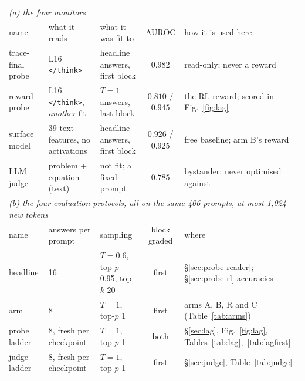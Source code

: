 \documentclass{article}
\begin{document}
\begin{table}[t]
\centering
\scriptsize
\setlength{\tabcolsep}{3pt}
\renewcommand{\arraystretch}{0.9}
\begin{tabular}{lllcl}
\toprule
\multicolumn{5}{l}{\emph{(a) the four monitors}} \\
name & what it reads & what it was fit to & AUROC & how it is used here \\
\midrule
trace-final probe & L16 \texttt{</think>} & headline answers, first block & $0.982$ & read-only; never a reward \\
reward probe & L16 \texttt{</think>}, \emph{another} fit & $T{=}1$ answers, last block & $0.810$ / $0.945$ & the RL reward; scored in Fig.~\ref{fig:lag} \\
surface model & 39 text features, no activations & headline answers, first block & $0.926$ / $0.925$ & free baseline; arm B's reward \\
LLM judge & problem + equation (text) & not fit; a fixed prompt & $0.785$ & bystander; never optimised against \\
\midrule
\multicolumn{5}{l}{\emph{(b) the four evaluation protocols, all on the same 406 prompts, at most 1{,}024 new tokens}} \\
name & answers per prompt & sampling & block graded & where \\
\midrule
headline & 16 & $T{=}0.6$, top-$p$ 0.95, top-$k$ 20 & first & \S\ref{sec:probe-reader}; \S\ref{sec:probe-rl} accuracies \\
arm & 8 & $T{=}1$, top-$p$ 1 & first & arms A, B, R and C (Table~\ref{tab:arms}) \\
probe ladder & 8, fresh per checkpoint & $T{=}1$, top-$p$ 1 & both & \S\ref{sec:lag}, Fig.~\ref{fig:lag}, Tables~\ref{tab:lag},~\ref{tab:lagfirst} \\
judge ladder & 8, fresh per checkpoint & $T{=}1$, top-$p$ 1 & first & \S\ref{sec:judge}, Table~\ref{tab:judge} \\
\bottomrule
\end{tabular}

\end{table}
\end{document}
